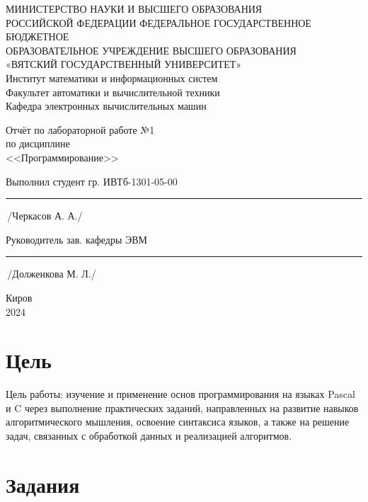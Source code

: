 \documentclass[oneside,a4paper,14pt]{extarticle}
\begin{document}
\newpage
\thispagestyle{empty}
\begin{center}
	МИНИСТЕРСТВО НАУКИ И ВЫСШЕГО ОБРАЗОВАНИЯ\\
	РОССИЙСКОЙ ФЕДЕРАЦИИ
	ФЕДЕРАЛЬНОЕ ГОСУДАРСТВЕННОЕ БЮДЖЕТНОЕ\\
	ОБРАЗОВАТЕЛЬНОЕ
	УЧРЕЖДЕНИЕ ВЫСШЕГО ОБРАЗОВАНИЯ\\
	«ВЯТСКИЙ ГОСУДАРСТВЕННЫЙ УНИВЕРСИТЕТ»\\
	Институт математики и информационных систем\\
	Факультет автоматики и вычислительной техники\\
	Кафедра электронных вычислительных машин
\end{center}
\vspace{20mm}

\begin{center}
	Отчёт по лабораторной работе №1\\
	по дисциплине\\
	<<Программирование>>\\
\end{center}
\vspace{55mm}

Выполнил студент гр. ИВТб-1301-05-00 \hspace{5mm} \rule[-0,5mm]{30mm}{0.15mm}\,/Черкасов А. А./


Руководитель зав. кафедры ЭВМ \hfill  \rule[-0,5mm]{30mm}{0.15mm}\,/Долженкова М. Л./

\vfill
\begin{center}
	Киров\\
	2024
\end{center}

\newpage\thispagestyle{plain}

\section*{Цель}

\sloppy Цель работы: изучение и применение основ программирования на языках Pascal и C через выполнение практических заданий, направленных на развитие навыков алгоритмического мышления, освоение синтаксиса языков, а также на решение задач, связанных с обработкой данных и реализацией алгоритмов.

\section*{Задания}
\end{document}
